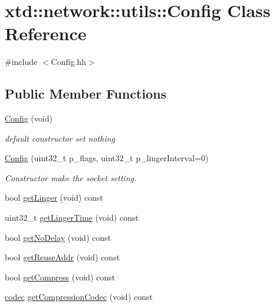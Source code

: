 \hypertarget{classxtd_1_1network_1_1utils_1_1Config}{}\section{xtd\+:\+:network\+:\+:utils\+:\+:Config Class Reference}
\label{classxtd_1_1network_1_1utils_1_1Config}


{\ttfamily \#include $<$Config.\+hh$>$}

\subsection*{Public Member Functions}
\begin{DoxyCompactItemize}
\item 
\hyperlink{classxtd_1_1network_1_1utils_1_1Config_a38494ac8cb1f19047196843e3b911f8a}{Config} (void)
\begin{DoxyCompactList}\small\item\em default constructor set nothing \end{DoxyCompactList}\item 
\hyperlink{classxtd_1_1network_1_1utils_1_1Config_abbf53027f45806e78cec4f50e4ea7def}{Config} (uint32\+\_\+t p\+\_\+flags, uint32\+\_\+t p\+\_\+linger\+Interval=0)
\begin{DoxyCompactList}\small\item\em Constructor make the socket setting. \end{DoxyCompactList}\item 
bool \hyperlink{classxtd_1_1network_1_1utils_1_1Config_ab43d43856cea3b9bf159b38d2d13d82b}{get\+Linger} (void) const 
\item 
uint32\+\_\+t \hyperlink{classxtd_1_1network_1_1utils_1_1Config_aacb13cdd90746d5684feb00d7cdbefcc}{get\+Linger\+Time} (void) const 
\item 
bool \hyperlink{classxtd_1_1network_1_1utils_1_1Config_a499712a4fd63e48be43ff24eb94e72ff}{get\+No\+Delay} (void) const 
\item 
bool \hyperlink{classxtd_1_1network_1_1utils_1_1Config_a3914a56737d69dd8879e03ed9b3dc855}{get\+Reuse\+Addr} (void) const 
\item 
bool \hyperlink{classxtd_1_1network_1_1utils_1_1Config_a89faeb4f4a949ae6fe18b907814987ee}{get\+Compress} (void) const 
\item 
\hyperlink{namespacextd_1_1network_1_1utils_a3ac1216ad2037b366cc1f9051a978161}{codec} \hyperlink{classxtd_1_1network_1_1utils_1_1Config_a82a7b809f4d41f4124badef452b9698d}{get\+Compression\+Codec} (void) const 

\end{DoxyCompactItemize}
